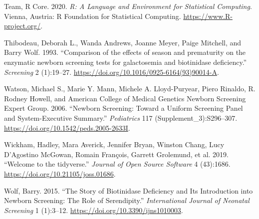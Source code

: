 \documentclass[review]{elsarticle}
\begin{document}
\begin{hangparas}{1.5em}{1}
\hypertarget{citeproc_bib_item_8}{Team, R Core. 2020. \textit{R: A Language and Environment for Statistical Computing}. Vienna, Austria: R Foundation for Statistical Computing. \href{https://www.R-project.org/}{https://www.R-project.org/}.}

\hypertarget{citeproc_bib_item_9}{Thibodeau, Deborah L., Wanda Andrews, Joanne Meyer, Paige Mitchell, and Barry Wolf. 1993. “Comparison of the effects of season and prematurity on the enzymatic newborn screening tests for galactosemia and biotinidase deficiency.” \textit{Screening} 2 (1):19–27. \href{https://doi.org/10.1016/0925-6164(93)90014-A}{https://doi.org/10.1016/0925-6164(93)90014-A}.}

\hypertarget{citeproc_bib_item_10}{Watson, Michael S., Marie Y. Mann, Michele A. Lloyd-Puryear, Piero Rinaldo, R. Rodney Howell, and American College of Medical Genetics Newborn Screening Expert Group. 2006. “Newborn Screening: Toward a Uniform Screening Panel and System-Executive Summary.” \textit{Pediatrics} 117 (Supplement\_3):S296–307. \href{https://doi.org/10.1542/peds.2005-2633I}{https://doi.org/10.1542/peds.2005-2633I}.}

\hypertarget{citeproc_bib_item_11}{Wickham, Hadley, Mara Averick, Jennifer Bryan, Winston Chang, Lucy D’Agostino McGowan, Romain François, Garrett Grolemund, et al. 2019. “Welcome to the tidyverse.” \textit{Journal of Open Source Software} 4 (43):1686. \href{https://doi.org/10.21105/joss.01686}{https://doi.org/10.21105/joss.01686}.}

\hypertarget{citeproc_bib_item_12}{Wolf, Barry. 2015. “The Story of Biotinidase Deficiency and Its Introduction into Newborn Screening: The Role of Serendipity.” \textit{International Journal of Neonatal Screening} 1 (1):3–12. \href{https://doi.org/10.3390/ijns1010003}{https://doi.org/10.3390/ijns1010003}.}
\end{hangparas}
\end{document}

